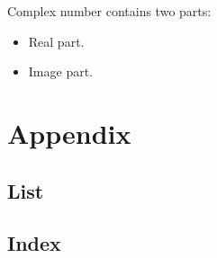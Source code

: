\documentclass[notitlepage,openany]{book}
\begin{document}
    Complex number contains two parts:

    \begin{itemize}
    \item Real part.    
    \item Image part.   
    \end{itemize}

\chapter{Appendix}

	\section{List}
		\listoftables
		\listoffigures

	\section{Index}
		\printindex

\end{document}
